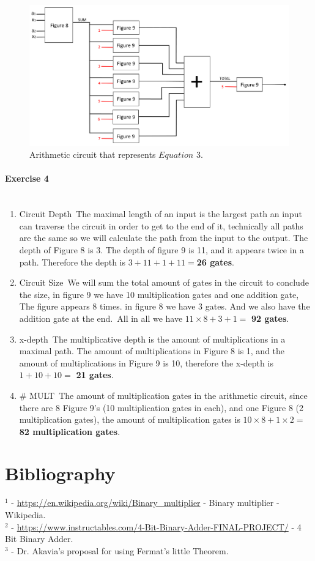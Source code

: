 \documentclass{article}
\begin{document}
\begin{figure}[H]
    \centering
    \includegraphics[width=1.25\linewidth]{FinalArithmeticCircuit.png}
    \caption{Arithmetic circuit that represents $Equation$ $3$.}
    \label{fig:enter-label}
\end{figure}


\newpage
\paragraph{\LARGE Exercise 4\\\\}

\begin{enumerate}[i]
  \item Circuit Depth\
  The maximal length of an input is the largest path an input can traverse the circuit in order to get to the end of it, technically all paths are the same so we will calculate the path from the input to the output.
  The depth of Figure 8 is 3. The depth of figure 9 is 11, and it appears twice in a path. Therefore the depth is $3+11+1+11=$\textbf{26 gates}.
  \item Circuit Size\
  We will sum the total amount of gates in the circuit to conclude the size, in figure 9 we have 10 multiplication gates and one addition gate, The figure appears 8 times. in figure 8 we have 3 gates. And we also have the  addition gate at the end.\
  All in all we have $ 11\times 8 + 3 + 1 =$ \textbf{92 gates}.
  \item x-depth\
  The multiplicative depth is the amount of multiplications in a maximal path. The amount of multiplications in Figure 8 is 1, and the amount of multiplications in Figure 9 is 10, therefore the x-depth is $1+10+10=$ \textbf{21 gates}.
  \item \# MULT\
  The amount of multiplication gates in the arithmetic circuit, since there are 8 Figure 9's (10 multiplication gates in each), and one Figure 8 (2 multiplication gates), the amount of multiplication gates is $10\times8+1\times2=$ \textbf{82 multiplication gates}.
\end{enumerate}

\newpage

\section{Bibliography}
$^{1}$ - \url{https://en.wikipedia.org/wiki/Binary_multiplier} - Binary multiplier - Wikipedia.\\
$^{2}$ - \url{https://www.instructables.com/4-Bit-Binary-Adder-FINAL-PROJECT/} - 4 Bit Binary Adder.\\
$^{3}$ - Dr. Akavia's proposal for using Fermat's little Theorem.
\end{document}
